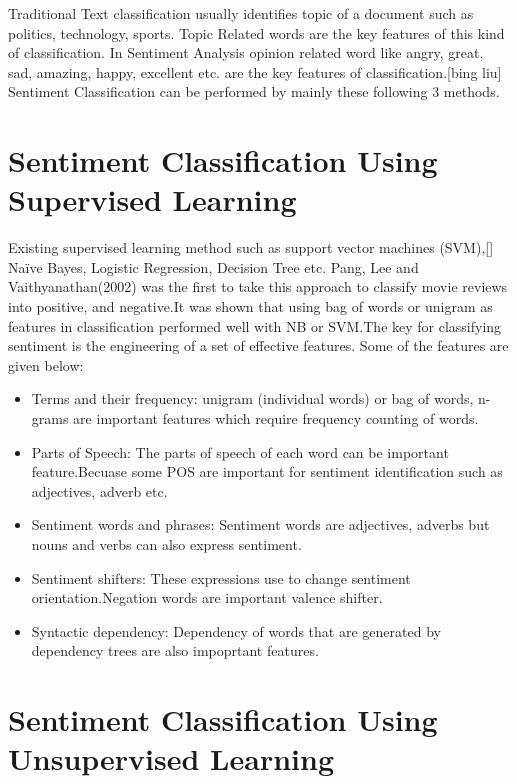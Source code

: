 \documentclass[a4paper,12pt]{report}
\begin{document}
Traditional Text classification usually identifies topic of a document such as politics, technology, sports. Topic Related words are the key features of this kind of classification. In Sentiment Analysis opinion related word like angry, great, sad, amazing, happy, excellent etc. are the key features of classification.[bing liu] Sentiment Classification  can be performed by mainly these following 3 methods.


\section{Sentiment Classification Using Supervised Learning}

Existing supervised learning method such as support vector machines (SVM),[] Naïve Bayes, Logistic Regression, Decision Tree etc. Pang, Lee and Vaithyanathan(2002)  \citep{pang2002thumbs} was the first to take this approach to classify movie reviews into positive, and negative.It was shown that using bag of words or unigram as features in classification performed well with NB or SVM.The key for classifying sentiment is the engineering of a set of effective features. Some of the features are given below:
\begin{itemize}
    \item Terms and their frequency: unigram (individual words) or bag of words, n-grams are important features which require frequency counting of words.
    \item Parts of Speech: The parts of speech of each word can be important feature.Becuase some POS are important for sentiment identification such as adjectives, adverb etc.
    \item Sentiment words and phrases: Sentiment words are adjectives, adverbs but nouns and verbs can also express sentiment.
    \item Sentiment shifters: These expressions use to change sentiment orientation.Negation words are important valence shifter.
    \item Syntactic dependency: Dependency of words that are generated by dependency trees are also impoprtant features.
    
\end{itemize}
    
\section{Sentiment Classification Using Unsupervised Learning}
\end{document}
